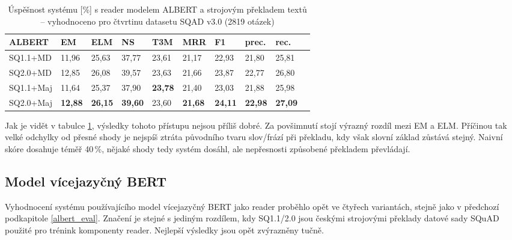 \begin{table}[H]
    \centering
    \begin{tabular}{|l||l|l|l|l|l|l|l|l|l|}
        \hline
        \textbf{ALBERT}  & \textbf{EM}   & ELM       & NS        & T3M       & MRR       & \textbf{F1}   & prec.         & rec. \\ \hline\hline
            SQ1.1+MD    & 11,96         & 25,63     & 37,77     & 23,61     & 21,17     & 22,93         & 21,80         & 25,81    \\ \hline
            SQ2.0+MD    & 12,85         & 26,08     & 39,57     & 23,63     & 21,66     & 23,87         & 22,77         & 26,80    \\ \hline
            SQ1.1+Maj   & 11,64         & 25,37     & 37,90     & \textbf{23,78}     & 21,40     & 23,03         & 21,88         & 25,98    \\ \hline
            SQ2.0+Maj   & \textbf{12,88}& \textbf{26,15}& \textbf{39,60}& 23,60     & \textbf{21,68}     & \textbf{24,11}         & \textbf{22,98}         & \textbf{27,09}    \\ \hline
    \end{tabular}
    \caption{Úspěšnost systému [\%] s reader modelem ALBERT a strojovým překladem textů -- vyhodnoceno pro čtvrtinu datasetu SQAD v3.0 (2819 otázek)}
    \label{tab:system_eval_albert}
\end{table}
Jak je vidět v tabulce \ref{tab:system_eval_albert}, výsledky tohoto přístupu nejsou příliš dobré. Za povšimnutí stojí výrazný rozdíl mezi EM a ELM. Příčinou tak velké odchylky od přesné shody je nejspíš ztráta původního tvaru slov/frází při překladu, kdy však slovní základ zůstává stejný. Naivní skóre dosahuje téměř 40\,\%, nějaké shody tedy systém dosáhl, ale nepřesnosti způsobené překladem převládají.

\subsection{Model vícejazyčný BERT}
\label{mbert_eval}
Vyhodnocení systému používajícího model vícejazyčný BERT jako reader proběhlo opět ve čtyřech variantách, stejně jako v předchozí podkapitole \ref{albert_eval}. Značení je stejné s jediným rozdílem, kdy SQ1.1/2.0 jsou českými strojovými překlady datové sady SQuAD použité pro trénink komponenty reader. Nejlepší výsledky jsou opět zvýrazněny tučně.

